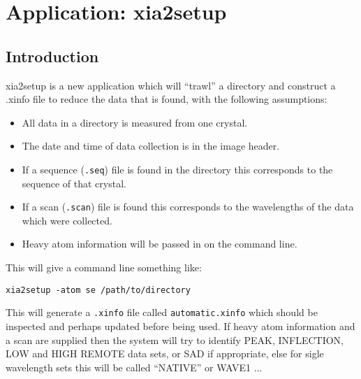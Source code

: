 \documentclass[a4paper, 11pt]{article}
\begin{document}
\section{Application: xia2setup}
\subsection{Introduction}

xia2setup is a new application which will ``trawl'' a directory and construct
a .xinfo file to reduce the data that is found, with the following assumptions:

\begin{itemize}
\item{All data in a directory is measured from one crystal.}
\item{The date and time of data collection is in the image header.}
\item{If a sequence (\verb|.seq|) file is found in the directory this
corresponds to the sequence of that crystal.}
\item{If a scan (\verb|.scan|) file is found this corresponds to the
wavelengths of the data which were collected.}
\item{Heavy atom information will be passed in on the command line.}
\end{itemize}

This will give a command line something like:

\begin{verbatim}
xia2setup -atom se /path/to/directory
\end{verbatim}

This will generate a \verb|.xinfo| file called \verb|automatic.xinfo|
which should be inspected and perhaps updated before being used. If heavy
atom information and a scan are supplied then the system will try to identify 
PEAK, INFLECTION, LOW and HIGH REMOTE data sets, or SAD if appropriate, else 
for sigle wavelength sets this will be called ``NATIVE'' or WAVE1 ...
\end{document}
